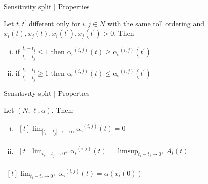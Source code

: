 \documentclass{beamer}
\newcommand{\as}{\mathrm{\alpha_s}}
\begin{document}
\begin{frame}{Sensitivity split | Properties}
	\begin{lemma}[Monotonicity]
		Let $t, t^\prime$ different only for $i, j \in N$ with the same toll ordering and $x_i(t), x_j(t), x_i(t^\prime), x_j(t^\prime) > 0$.
		Then
		\begin{enumerate}[(i)]
			\item if $\frac{t_i - t_j}{t_i^\prime - t_j^\prime} \le 1$ then $\as^{(i, j)}(t) \ge \as^{(i, j)}(t^\prime)$
			\item if $\frac{t_i - t_j}{t_i^\prime - t_j^\prime} \ge 1$ then $\as^{(i, j)}(t) \le \as^{(i, j)}(t^\prime)$
		\end{enumerate}
	\end{lemma}
\end{frame}

\begin{frame}{Sensitivity split | Properties}
	\begin{lemma}
		Let $(N, \ell, \alpha)$.
		Then:
		\begin{enumerate}[(i)]
			\item
			$\begin{aligned}[t]
				\lim_{|t_i - t_j| \rightarrow +\infty}\as^{(i, j)}(t) = 0
			\end{aligned}$
			\item
			$\begin{aligned}[t]
				\lim_{t_i - t_j \rightarrow 0^+} \as^{(i, j)}(t) = \limsup_{t_i - t_j \rightarrow 0^+} A_i(t)
			\end{aligned}$
		\end{enumerate}
	\end{lemma}
	\begin{corollary}
		$\begin{aligned}[t]
			\lim_{t_i - t_j \rightarrow 0^+} \as^{(i, j)}(t) = \alpha(x_i(0))
		\end{aligned}$
	\end{corollary}
\end{frame}
\end{document}
